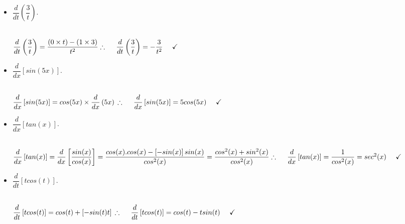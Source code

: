 \documentclass[fleqn]{article}
\begin{document}
\begin{enumerate}
\begin{itemize}
      \item $\dfrac{d}{dt} \left(\dfrac{3}{t}\right)$.

        \textcolor{hwColor}{
          \\
          $
            \dfrac{d}{dt} \left(\dfrac{3}{t}\right)=\dfrac{(0 \times t)-(1 \times 3)}{t^2}
            \\
            \\
            \\
            \therefore ~~~~ \dfrac{d}{dt} \left(\dfrac{3}{t}\right)=-\dfrac{3}{t^2} ~~~~ \checkmark
            \\
          $
        }

      \item $\dfrac{d}{dx} \left[sin(5x)\right]$.

        \textcolor{hwColor}{
          \\
          $
            \dfrac{d}{dx} \left[sin(5x)\right]=cos(5x) \times \dfrac{d}{dx} \left(5x\right)
            \\
            \\
            \\
            \therefore ~~~~ \dfrac{d}{dx} \left[sin(5x)\right]=5cos(5x) ~~~~ \checkmark
            \\
          $
        }

      \item $\dfrac{d}{dx} \left[tan(x)\right]$.

        \textcolor{hwColor}{
          \\
          $
            \dfrac{d}{dx} \left[tan(x)\right]=\dfrac{d}{dx} \left[\dfrac{sin(x)}{cos(x)}\right]
            =\dfrac{cos(x).cos(x)-\left[-sin(x)\right]sin(x)}{cos^2(x)}
            =\dfrac{cos^2(x)+sin^2(x)}{cos^2(x)}
            \\
            \\
            \\
            \therefore ~~~~ \dfrac{d}{dx} \left[tan(x)\right]=\dfrac{1}{cos^2(x)}=sec^2(x) ~~~~ \checkmark
          $
        }

      \item $\dfrac{d}{dt} \left[t cos(t)\right]$.

        \textcolor{hwColor}{
          \\
          $
            \dfrac{d}{dt} \left[t cos(t)\right]=cos(t)+\left[-sin(t)t\right]
            \\
            \\
            \\
            \therefore ~~~~ \dfrac{d}{dt} \left[t cos(t)\right]=cos(t)-tsin(t) ~~~~ \checkmark
            \\
          $
        }


\end{itemize}
\end{enumerate}
\end{document}
